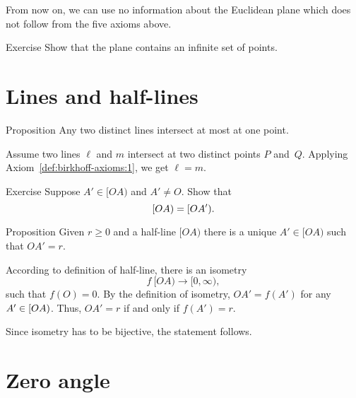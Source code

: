 From now on,  
we can use no information about the Euclidean plane which does not follow from the five axioms above.

\begin{thm}{Exercise}\label{ex:infinite}
Show that the plane contains an infinite set of points.
\end{thm}

\newpage

\section*{Lines and half-lines}

\begin{thm}[\abs]{Proposition}\label{lem:line-line}
\let\thefootnote\relax{}
Any two distinct lines intersect at most at one point.
\end{thm}

Assume two lines $\ell$ and $m$ intersect at two distinct points $P$ and~$Q$.
Applying Axiom~\ref{def:birkhoff-axioms:1}, we get $\ell=m$.
\qeds

\begin{thm}{Exercise}\label{ex:[OA)=[OA')}
Suppose $A'\in[OA)$ and $A'\not=O$. 
Show that 
\[[O A)\z=[O A').\]

\end{thm}

\begin{thm}[\abs]{Proposition}\label{prop:point-on-half-line}
Given $r\ge 0$ and a half-line $[O A)$ there is a unique $A'\in [O A)$  such that $O A'=r$.
\end{thm}

According to definition of half-line, 
there is an isometry 
$$f\:[O A)\to [0,\infty),$$
such that $f(O)=0$.
By the definition of isometry, $O A'=f(A')$ for any $A'\z\in [O A)$.
Thus, $O A'=r$ if and only if $f(A')=r$.

Since isometry has to be bijective, the statement follows.
\qeds

\section*{Zero angle}

